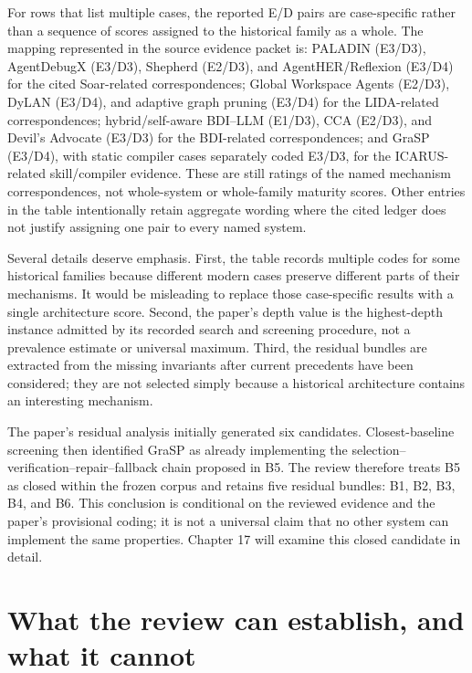 For rows that list multiple cases, the reported E/D pairs are case-specific rather than a sequence of scores assigned to the historical family as a whole. The mapping represented in the source evidence packet is: PALADIN (E3/D3), AgentDebugX (E3/D3), Shepherd (E2/D3), and AgentHER/Reflexion (E3/D4) for the cited Soar-related correspondences; Global Workspace Agents (E2/D3), DyLAN (E3/D4), and adaptive graph pruning (E3/D4) for the LIDA-related correspondences; hybrid/self-aware BDI--LLM (E1/D3), CCA (E2/D3), and Devil's Advocate (E3/D3) for the BDI-related correspondences; and GraSP (E3/D4), with static compiler cases separately coded E3/D3, for the ICARUS-related skill/compiler evidence. These are still ratings of the named mechanism correspondences, not whole-system or whole-family maturity scores. Other entries in the table intentionally retain aggregate wording where the cited ledger does not justify assigning one pair to every named system.

Several details deserve emphasis. First, the table records multiple codes for some historical families because different modern cases preserve different parts of their mechanisms. It would be misleading to replace those case-specific results with a single architecture score. Second, the paper's depth value is the highest-depth instance admitted by its recorded search and screening procedure, not a prevalence estimate or universal maximum. Third, the residual bundles are extracted from the missing invariants after current precedents have been considered; they are not selected simply because a historical architecture contains an interesting mechanism.

The paper's residual analysis initially generated six candidates. Closest-baseline screening then identified GraSP as already implementing the selection--verification--repair--fallback chain proposed in B5. The review therefore treats B5 as closed within the frozen corpus and retains five residual bundles: B1, B2, B3, B4, and B6. This conclusion is conditional on the reviewed evidence and the paper's provisional coding; it is not a universal claim that no other system can implement the same properties. Chapter 17 will examine this closed candidate in detail.

\section{What the review can establish, and what it cannot}
\label{sec:ch11-validity}

